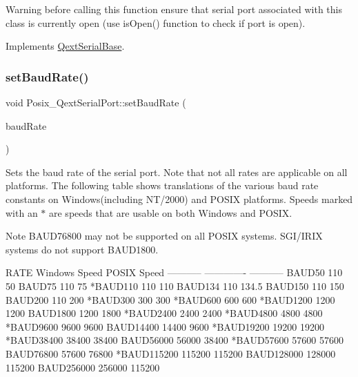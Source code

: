 \begin{DoxyWarning}{Warning}
before calling this function ensure that serial port associated with this class is currently open (use is\+Open() function to check if port is open). 
\end{DoxyWarning}


Implements \mbox{\hyperlink{class_qext_serial_base}{Qext\+Serial\+Base}}.

\mbox{\label{class_posix___qext_serial_port_a007fcdd90f1137b010b6c43aa5b6dc6e}} 
\subsubsection{\texorpdfstring{set\+Baud\+Rate()}{setBaudRate()}}
{\footnotesize\ttfamily void Posix\+\_\+\+Qext\+Serial\+Port\+::set\+Baud\+Rate (\begin{DoxyParamCaption}\item[{Baud\+Rate\+Type}]{baud\+Rate }\end{DoxyParamCaption})\hspace{0.3cm}{\ttfamily [virtual]}}

Sets the baud rate of the serial port. Note that not all rates are applicable on all platforms. The following table shows translations of the various baud rate constants on Windows(including N\+T/2000) and P\+O\+S\+IX platforms. Speeds marked with an $\ast$ are speeds that are usable on both Windows and P\+O\+S\+IX.

\begin{DoxyNote}{Note}
B\+A\+U\+D76800 may not be supported on all P\+O\+S\+IX systems. S\+G\+I/\+I\+R\+IX systems do not support B\+A\+U\+D1800.
\end{DoxyNote}
\begin{DoxyVerb}  RATE          Windows Speed   POSIX Speed
  -----------   -------------   -----------
   BAUD50                 110          50
   BAUD75                 110          75
  *BAUD110                110         110
   BAUD134                110         134.5
   BAUD150                110         150
   BAUD200                110         200
  *BAUD300                300         300
  *BAUD600                600         600
  *BAUD1200              1200        1200
   BAUD1800              1200        1800
  *BAUD2400              2400        2400
  *BAUD4800              4800        4800
  *BAUD9600              9600        9600
   BAUD14400            14400        9600
  *BAUD19200            19200       19200
  *BAUD38400            38400       38400
   BAUD56000            56000       38400
  *BAUD57600            57600       57600
   BAUD76800            57600       76800
  *BAUD115200          115200      115200
   BAUD128000          128000      115200
   BAUD256000          256000      115200
\end{DoxyVerb}
 

